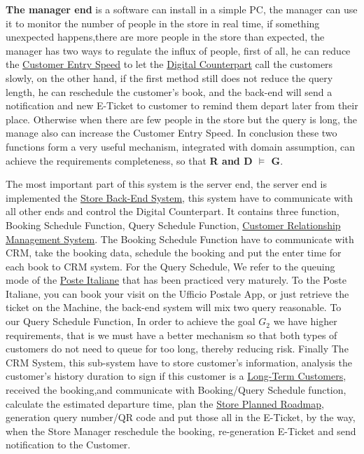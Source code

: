 \documentclass[a4paper,12pt]{book}
\begin{document}
\textbf{The manager end} is a software can install in a simple PC, the manager can use it to monitor the number of people in the store in real time, if something unexpected happens,there are more people in the store than expected, the manager has two ways to regulate the influx of people, first of all, he can reduce the \hyperref[Definitions]{Customer Entry Speed} to let the \hyperref[Definitions]{Digital Counterpart} call the customers slowly, on the other hand, if the first method still does not reduce the query length, he can reschedule the customer's book, and the back-end  will send a notification and new E-Ticket to customer to remind them depart later from their place. Otherwise when there are few people in the store but the query is long, the manage also can increase the Customer Entry Speed. In conclusion these two functions form a very useful mechanism, integrated with domain assumption, can achieve the requirements completeness, so that \textbf{R and D   $\models$   G}.

The most important part of this system is the server end, the server end is implemented the \hyperref[Definitions]{Store Back-End System}, this system have to communicate with all other ends and control the Digital Counterpart. It contains three function, Booking Schedule Function, Query Schedule Function, \hyperref[Reference documents]{Customer Relationship Management System}. The Booking Schedule Function have to communicate with CRM, take the booking data, schedule the booking and put the enter time for each book to CRM system. For the Query Schedule, We refer to the queuing mode of the \hyperref[Reference documents]{Poste Italiane} that has been practiced very maturely. To the Poste Italiane, you can book your visit on the Ufficio Postale App, or just retrieve the ticket on the Machine, the back-end system will mix two query reasonable. To our Query Schedule Function, In order to achieve the goal $G_2$ we have higher requirements, that is we must have a better mechanism so that both types of customers do not need to queue for too long, thereby reducing risk. Finally The CRM System, this sub-system have to store customer's information, analysis the customer's history duration to sign if this customer is a \hyperref[Definitions]{Long-Term Customers}, received the booking,and communicate with Booking/Query Schedule function, calculate the  estimated departure time, plan the \hyperref[Definitions]{Store Planned Roadmap}, generation query number/QR code and put those all in the E-Ticket, by the way, when the Store Manager reschedule the booking, re-generation E-Ticket and send notification to the Customer.
\end{document}
